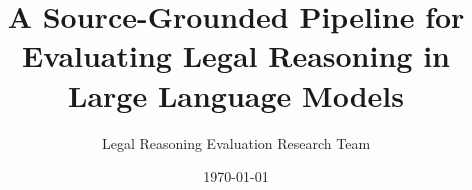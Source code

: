 \documentclass[conference]{IEEEtran}
\title{A Source-Grounded Pipeline for Evaluating Legal Reasoning in Large Language Models}
\author{Legal Reasoning Evaluation Research Team}
\date{\today}
\begin{document}
\maketitle












\clearpage
\appendices
\onecolumn




\end{document}
